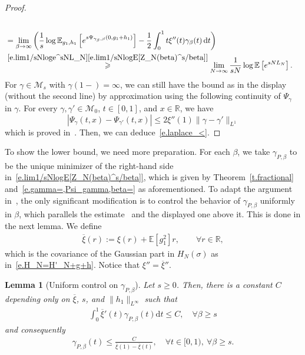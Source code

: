 \documentclass[11pt]{amsart}
\newtheorem{lemma}[proposition]{Lemma}
\theoremstyle{remark}
\theoremstyle{definition}
\numberwithin{equation}{section}
\numberwithin{proposition}{section}
\numberwithin{figure}{section}
\numberwithin{table}{section}
\newcommand{\R}{\mathbb{R}}
\newcommand{\E}{\mathbb{E}}
\renewcommand{\le}{\leqslant}
\renewcommand{\leq}{\leqslant}
\renewcommand{\geq}{\geqslant}
\renewcommand{\bar}{\overline}
\newcommand{\Ll}{\left}
\newcommand{\Rr}{\right}
\renewcommand{\d}{\mathrm{d}}
\newcommand{\1}{\mathbf{1}}
\newcommand{\mcl}{\mathcal}
\newcommand{\ga}{\gamma}
\newcommand{\cM}{\mathcal{M}}
\begin{document}
\begin{proof}
\begin{align*}
    \\
    &=\lim_{\beta\to\infty}\bigg( \frac 1 s \log \E_{g_1,h_1}\Ll[e^{s\Psi_{\gamma_\beta,\beta}(0,g_1+h_1)}\Rr] - \frac{1}{2} \int_0^1 t \xi''(t) \gamma_\beta(t) \, \d t \bigg) 
    \\
    &\stackrel{\eqref{e.lim1/sNloge^sNL_N}\eqref{e.lim1/sNlogE[Z_N(beta)^s/beta]}}{\geq} \lim_{N\to \infty} \frac{1}{sN} \log \E \Ll[ e^{sN L_N} \Rr].
\end{align*}
For $\gamma\in\cM_s$ with $\gamma(1-)=\infty$, we can still have the bound as in the display (without the second line) by approximation using the following continuity of $\Psi_\gamma$ in $\gamma$.
For every $\gamma, \gamma' \in \mcl M_0$, $t \in [0,1]$, and $x \in \R$, we have
\begin{equation*}  %
\Ll| \Psi_\ga(t,x) -  \Psi_{\gamma'}(t,x) \Rr| \le 2\xi''(1)  \|\ga  - \gamma'\|_{L^1}
\end{equation*}
which is proved in~\cite[Corollary~2]{auffinger2017parisi}. Then, we can deduce~\eqref{e.laplace_<}.
\end{proof}


To show the lower bound, we need more preparation. 
For each $\beta$, we take $\gamma_{P,\beta}$ to be the unique minimizer of the right-hand side in~\eqref{e.lim1/sNlogE[Z_N(beta)^s/beta]}, which is given by Theorem~\ref{t.fractional} and~\eqref{e.gamma=,Psi_gamma,beta=} as aforementioned. To adapt the argument in~\cite{auffinger2017parisi}, the only significant modification is to control the behavior of $\gamma_{P,\beta}$ uniformly in $\beta$, which parallels the estimate~\cite[(3.2)]{auffinger2017parisi} and the displayed one above it. This is done in the next lemma. We define
\begin{align*}
    \bar\xi(r) :=\xi(r) + \E[g_1^2]r,\qquad \forall r\in\R,%
\end{align*}
which is the covariance of the Gaussian part in $H_N(\sigma)$ as in~\eqref{e.H_N=H'_N+g+h}. Notice that $\xi''=\bar\xi''$.

\begin{lemma}[Uniform control on $\gamma_{P,\beta}$]\label{l.tail_gamma_P,beta}
Let $s \geq 0$.
Then, there is a constant $C$ depending only on $\bar\xi$, $s$, and $\|h_1\|_{L^\infty}$ such that
\begin{align}\label{e.gamam_L^1_bd}
    \int_0^1\bar\xi'(t)\gamma_{P,\beta}(t)\d t \leq C,\quad\forall \beta\geq s
\end{align}
and consequently
\begin{align}\label{e.l.tail_gamma_P,beta}
    \gamma_{P,\beta}(t)\leq \frac{C}{\bar\xi(1)-\bar\xi(t)},\quad\forall t\in[0,1),\ \forall \beta\geq s. %
\end{align}
\end{lemma}
\end{document}
